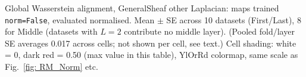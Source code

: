 \begin{table}[H]
\begin{minipage}{0.15\textwidth}
\end{minipage}
\caption{Global Wasserstein alignment, GeneralSheaf other Laplacian: maps trained \texttt{norm=False}, evaluated normalised. Mean $\pm$ SE across 10 datasets (First/Last), 8 for Middle (datasets with $L=2$ contribute no middle layer). (Pooled fold/layer SE averages 0.017 across cells; not shown per cell, see text.) Cell shading: white = 0, dark red = 0.50 (max value in this table), YlOrRd colormap, same scale as Fig.~\ref{fig: RM_Norm} etc.}
\label{tab:global_general_other_norm}
\end{table}
